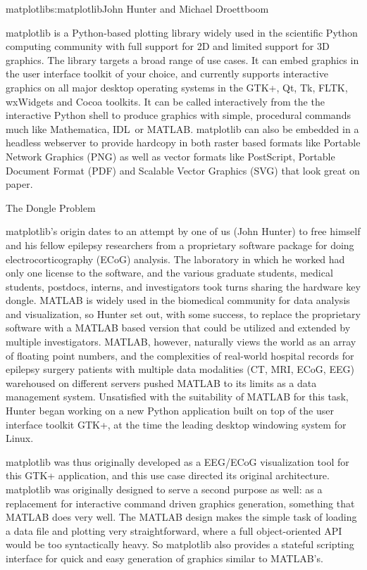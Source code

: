 \begin{aosachapter}{matplotlib}{s:matplotlib}{John Hunter and Michael Droettboom}

matplotlib is a Python-based plotting library widely used in
the scientific Python computing community with full support for 2D and
limited support for 3D graphics.  The library targets a broad range of
use cases.  It can embed graphics in the user interface toolkit of
your choice, and currently supports interactive graphics on all major
desktop operating systems in the GTK+, Qt, Tk, FLTK, wxWidgets and
Cocoa toolkits.  It can be called interactively from the the
interactive Python shell to produce graphics with simple, procedural
commands much like Mathematica\texttrademark, IDL\texttrademark\ or
MATLAB\texttrademark.  matplotlib can also be embedded in a headless
webserver to provide hardcopy in both raster based formats like
Portable Network Graphics (PNG) as well as vector formats like
PostScript, Portable Document Format (PDF) and Scalable Vector
Graphics (SVG) that look great on paper.

\begin{aosasect1}{The Dongle Problem}

matplotlib's origin dates to an attempt by one of us (John Hunter) to
free himself and his fellow epilepsy researchers from a proprietary
software package for doing electrocorticography (ECoG) analysis.  The
laboratory in which he worked had only one license to the software,
and the various graduate students, medical students, postdocs, interns,
and investigators took turns sharing the hardware key dongle.
MATLAB is widely used in the biomedical community for
data analysis and visualization, so Hunter set out, with some success,
to replace the proprietary software with a MATLAB based version that
could be utilized and extended by multiple investigators.  MATLAB,
however, naturally views the world as an array of floating point
numbers, and the complexities of real-world hospital records for
epilepsy surgery patients with multiple data modalities (CT, MRI,
ECoG, EEG) warehoused on different servers pushed MATLAB to its limits
as a data management system.  Unsatisfied with the suitability of
MATLAB for this task, Hunter began working on a new Python application
built on top of the user interface toolkit GTK+, at the time the
leading desktop windowing system for Linux.

matplotlib was thus originally developed as a EEG/ECoG visualization
tool for this GTK+ application, and this use case directed its
original architecture.  matplotlib was originally designed to serve a
second purpose as well: as a replacement for interactive command
driven graphics generation, something that MATLAB does very well.  The
MATLAB design makes the simple task of loading a data file and
plotting very straightforward, where a full object-oriented API would
be too syntactically heavy.  So matplotlib also provides a stateful
scripting interface for quick and easy generation of graphics similar
to MATLAB's.


\end{aosasect1}
\end{aosachapter}
